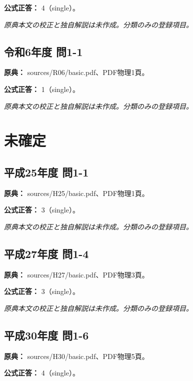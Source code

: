 \textbf{公式正答：} 4（single）。

\par\textit{原典本文の校正と独自解説は未作成。分類のみの登録項目。}

\subsection{令和6年度 問1-1}
\label{q:r06-reg-basic-1-1}

\noindent\textbf{原典：} sources/R06/basic.pdf、PDF物理1頁。

\textbf{公式正答：} 1（single）。

\par\textit{原典本文の校正と独自解説は未作成。分類のみの登録項目。}

\section{未確定}

\subsection{平成25年度 問1-1}
\label{q:h25-reg-basic-1-1}

\noindent\textbf{原典：} sources/H25/basic.pdf、PDF物理1頁。

\textbf{公式正答：} 3（single）。

\par\textit{原典本文の校正と独自解説は未作成。分類のみの登録項目。}

\subsection{平成27年度 問1-4}
\label{q:h27-reg-basic-1-4}

\noindent\textbf{原典：} sources/H27/basic.pdf、PDF物理3頁。

\textbf{公式正答：} 3（single）。

\par\textit{原典本文の校正と独自解説は未作成。分類のみの登録項目。}

\subsection{平成30年度 問1-6}
\label{q:h30-reg-basic-1-6}

\noindent\textbf{原典：} sources/H30/basic.pdf、PDF物理5頁。

\textbf{公式正答：} 4（single）。

